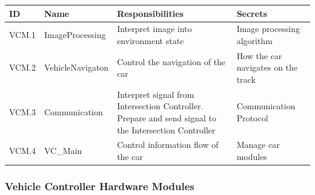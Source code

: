 \documentclass [10pt]{article}
\begin{document}
\begin{longtable}{ |p{ }  | p{ } |  p{ } |  p{ } |}  \hline
    
    \textbf{ID} & \textbf{Name} &  \textbf{Responsibilities} & \textbf{Secrets} \\ \hline
    
    \cellcolor{tableCell}VCM.1  &\cellcolor{tableCell}ImageProcessing &\cellcolor{tableCell}Interpret image into environment state &\cellcolor{tableCell}Image processing algorithm  \\ \hline
    
    VCM.2 & VehicleNavigaton & Control the navigation of the car & How the car navigates on the track \\ \hline
    
    \cellcolor{tableCell}VCM.3  & \cellcolor{tableCell}Communication & \cellcolor{tableCell}Interpret signal from Intersection Controller. Prepare and send signal to the Intersection Controller & \cellcolor{tableCell}Communication Protocol \\ \hline

    VCM.4 & VC\_Main & Control information flow of the car & Manage car modules \\ \hline
    
\end{longtable}



\subsubsection{Vehicle Controller Hardware Modules}
\end{document}
